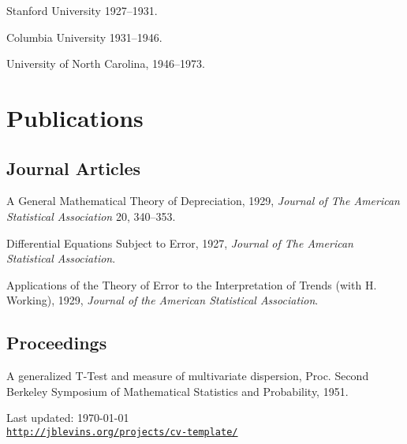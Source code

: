 \documentclass{article}
\def\footerlink{http://jblevins.org/projects/cv-template/}
\renewenvironment{itemize}{
  \begin{list}{}{
    \setlength{\leftmargin}{1.5em}
  }
}{
  \end{list}
}
\begin{document}
\begin{itemize}
\item Stanford University 1927--1931.
\item Columbia University 1931--1946.
\item University of North Carolina, 1946--1973.
\end{itemize}


\section*{Publications}

\subsection*{Journal Articles}

\begin{itemize}
\item A General Mathematical Theory of Depreciation, 1929, {\it Journal
    of The American Statistical Association} 20, 340--353.
\item Differential Equations Subject to Error, 1927, {\it Journal of The
    American Statistical Association}.
\item Applications of the Theory of Error to the Interpretation of
  Trends (with H. Working), 1929, {\it Journal of the American
    Statistical Association}.
\end{itemize}

\subsection*{Proceedings}

\begin{itemize}
\item A generalized T-Test and measure of multivariate dispersion,
  Proc. Second Berkeley Symposium of Mathematical Statistics and
  Probability, 1951.
\end{itemize}

\bigskip

\begin{center}
  \begin{footnotesize}
    Last updated: \today \\
    \href{\footerlink}{\texttt{\footerlink}}
  \end{footnotesize}
\end{center}
\end{document}

